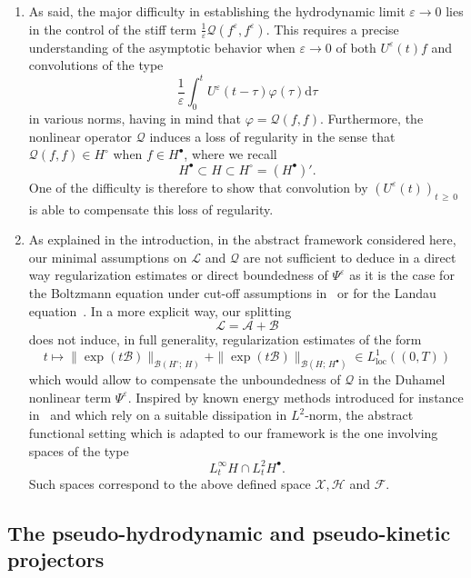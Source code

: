 \documentclass[AHL,Unicode,longabstracts,published]{cedram}
\renewcommand{\d}{\mathrm{d}}
\renewcommand{\AA}{\mathcal{A}}
\newcommand{\BB}{\mathcal{B}}
\newcommand{\LL}{\mathcal{L}}
\newcommand{\QQ}{\mathcal{Q}}
\newcommand{\BBB}{\mathscr{B}}
\newcommand{\FFF}{\mathscr{F}}
\newcommand{\HHH}{\mathscr{H}}
\newcommand{\GGG}{\mathscr{X}}
\newcommand{\Ss}{H}
\newcommand{\Ssp}{H^{\bullet}}
\newcommand{\Ssm}{H^{\circ}}
\newcommand{\SSSs}{\HHH}
\newcommand{\SSSl}{\GGG}
\newcommand{\SSSm}{\FFF}
\renewcommand*\ge{\geqslant}
\newcommand*\eps{{\varepsilon}}
\begin{document}
\begin{enumerate}
\item As said, the major difficulty in establishing the hydrodynamic limit $\eps \to 0$ lies in the control of the stiff term $\frac{1}{\eps}\QQ(f^\eps,f^\eps)$. This requires a precise understanding of the asymptotic behavior when $\eps \to 0$ of both $U^\eps(t)f$ and convolutions of the type
\[
\frac{1}{\eps} \int_0^t U^\eps(t-\tau)\varphi(\tau)\d\tau
\]
in various norms, having in mind that $\varphi=\QQ(f,f)$. {Furthermore,} the nonlinear operator $\QQ$ induces a loss of regularity in the sense that $\QQ(f, f) \in \Ssm$ when $f \in \Ssp$, where we recall
\[
{\Ssp \subset \Ss \subset \Ssm = (\Ssp)'}.
\]
One of the difficulty is therefore to show that convolution by $(U^\eps(t))_{t\,\ge\,0}$ is able to compensate this loss of regularity.
\item As explained in the introduction, in the abstract framework considered here, our minimal assumptions on $\LL$ and $\QQ$ are not sufficient to deduce in a direct way regularization estimates or direct boundedness of $\Psi^\eps$ as it is the case for the Boltzmann equation under cut-off assumptions in~\cite{BU1991,GT2020} or for the Landau equation~\cite{CRT2022}. In a more explicit way, our splitting
\[
\LL=\AA+\BB
\]
does not induce, in full generality, regularization estimates of the form
\[
t \mapsto \| \exp(t \BB) \|_{ \BBB\left(\Ssm ;\,\Ss \right) } + \| \exp(t \BB) \|_{ \BBB\left(\Ss ;\,\Ssp \right) } \in L^1_{\text{loc}}((0,T))
\]
which would allow to compensate the unboundedness of $\QQ$ in the Duhamel nonlinear term $\Psi^\eps$. Inspired by known energy methods introduced for instance in~\cite{G2004} and which rely on a suitable dissipation in $L^2$-norm, the abstract functional setting which is adapted to our framework is the one involving spaces of the type
\[
L^\infty_t \Ss \cap L^2_t \Ssp.
\]
Such spaces correspond to the above defined space $\SSSl, \SSSs$ and $\SSSm$.
\end{enumerate}

\subsection{The pseudo-hydrodynamic and pseudo-kinetic projectors}\label{scn:pseudo_hydro_kinetic}
\end{document}
